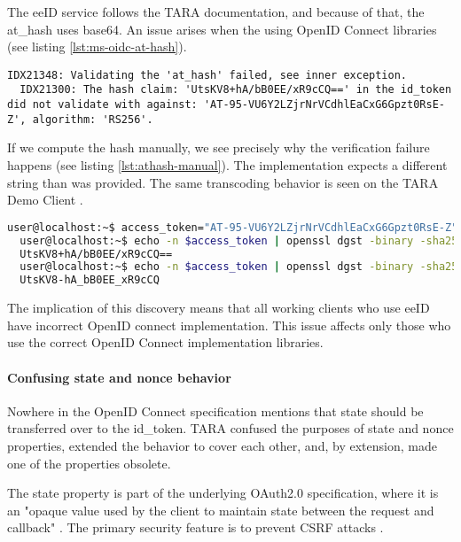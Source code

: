 The eeID service follows the TARA documentation, and because of that, the at\_hash uses base64. An issue arises when the using OpenID Connect libraries (see listing \ref{lst:ms-oidc-at-hash}).

\begin{lstlisting}[caption={Microsoft.IdentityModel.Protocols.OpenIdConnect fails to validate at\_hash}, label={lst:ms-oidc-at-hash}]
  IDX21348: Validating the 'at_hash' failed, see inner exception.
  IDX21300: The hash claim: 'UtsKV8+hA/bB0EE/xR9cCQ==' in the id_token did not validate with against: 'AT-95-VU6Y2LZjrNrVCdhlEaCxG6Gpzt0RsE-Z', algorithm: 'RS256'.
\end{lstlisting}

If we compute the hash manually, we see precisely why the verification failure happens (see listing \ref{lst:athash-manual}). The implementation expects a different string than was provided. The same transcoding behavior is seen on the TARA Demo Client \cite{tara-demorest}.

\begin{lstlisting}[caption={Verifying at\_hash manually}, label={lst:athash-manual}, language={bash}]
  user@localhost:~$ access_token="AT-95-VU6Y2LZjrNrVCdhlEaCxG6Gpzt0RsE-Z"
  user@localhost:~$ echo -n $access_token | openssl dgst -binary -sha256 | head -c 16 | base64
  UtsKV8+hA/bB0EE/xR9cCQ==
  user@localhost:~$ echo -n $access_token | openssl dgst -binary -sha256 | head -c 16 | base64 | tr '/+' '_-' | tr -d '='
  UtsKV8-hA_bB0EE_xR9cCQ
\end{lstlisting}

The implication of this discovery means that all working clients who use eeID have incorrect OpenID connect implementation. This issue affects only those who use the correct OpenID Connect implementation libraries.

\paragraph{Confusing state and nonce behavior}

Nowhere in the OpenID Connect specification mentions that state should be transferred over to the id\_token. TARA confused the purposes of state and nonce properties, extended the behavior to cover each other, and, by extension, made one of the properties obsolete.

The state property is part of the underlying OAuth2.0 specification, where it is an "opaque value used by the client to maintain state between the request and callback" \cite{rfc6749}. The primary security feature is to prevent CSRF attacks \cite{rfc6749,ietf-oauth-security-topics-19}.

